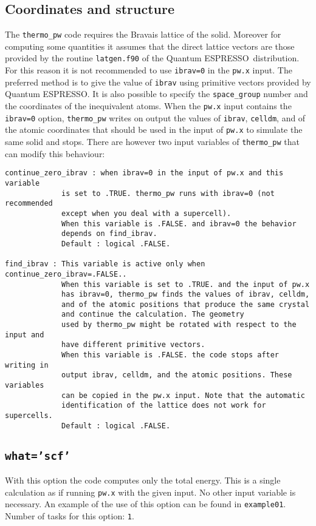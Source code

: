\documentclass[12pt,a4paper]{article}
\def\qe{{\sc Quantum ESPRESSO}}
\begin{document}
\subsection{\color{web-blue}Coordinates and structure}
The \texttt{thermo\_pw} code requires the Bravais lattice of the solid. 
Moreover for computing some quantities it assumes that the direct lattice 
vectors are those provided by the routine \texttt{latgen.f90} of the \qe\ 
distribution. 
For this reason it is not recommended to use \texttt{ibrav=0} in the
\texttt{pw.x} input. The preferred method is to give the value of 
\texttt{ibrav} using primitive vectors provided by \qe.
It is also possible to specify the \texttt{space\_group} number and 
the coordinates of the inequivalent atoms. When the 
\texttt{pw.x} input contains the \texttt{ibrav=0} option, 
\texttt{thermo\_pw} writes on output
the values of \texttt{ibrav}, \texttt{celldm}, and of the atomic coordinates
that should be used in the input of \texttt{pw.x} to simulate the same 
solid and stops. There are however two input variables of \texttt{thermo\_pw} 
that can modify this behaviour:
\begin{verbatim}
continue_zero_ibrav : when ibrav=0 in the input of pw.x and this variable 
             is set to .TRUE. thermo_pw runs with ibrav=0 (not recommended
             except when you deal with a supercell). 
             When this variable is .FALSE. and ibrav=0 the behavior 
             depends on find_ibrav.
             Default : logical .FALSE.

find_ibrav : This variable is active only when continue_zero_ibrav=.FALSE..
             When this variable is set to .TRUE. and the input of pw.x
             has ibrav=0, thermo_pw finds the values of ibrav, celldm,
             and of the atomic positions that produce the same crystal 
             and continue the calculation. The geometry 
             used by thermo_pw might be rotated with respect to the input and
             have different primitive vectors.
             When this variable is .FALSE. the code stops after writing in
             output ibrav, celldm, and the atomic positions. These variables 
             can be copied in the pw.x input. Note that the automatic 
             identification of the lattice does not work for supercells.
             Default : logical .FALSE.
\end{verbatim}

\subsection{\color{web-blue}\texttt{what='scf'}}
With this option the code computes only the total energy. This is a single
calculation as if running \texttt{pw.x} with the given input.
No other input variable is necessary.
An example of the use of this option can be found in \texttt{example01}. \\
Number of tasks for this option: \texttt{1}.
\end{document}
